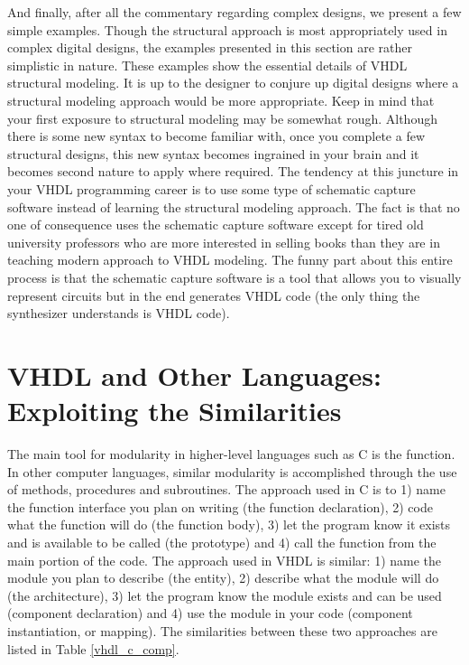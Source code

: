 And finally, after all the commentary regarding complex designs, we present a few simple examples. Though the structural approach is most appropriately used in complex digital designs, the examples presented in this section are rather simplistic in nature. These examples show the essential details of VHDL structural modeling. It is up to the designer to conjure up digital designs where a structural modeling approach would be more appropriate. Keep in mind that your first exposure to structural modeling may be somewhat rough. Although there is some new syntax to become familiar with, once you complete a few structural designs, this new syntax becomes ingrained in your brain and it becomes second nature to apply where required. The tendency at this juncture in your VHDL programming career is to use some type of schematic capture software instead of learning the structural modeling approach. The fact is that no one of consequence uses the schematic capture software except for tired old university professors who are more interested in selling books than they are in teaching modern approach to VHDL modeling. The funny part about this entire process is that the schematic capture software is a tool that allows you to visually represent circuits but in the end generates VHDL code (the only thing the synthesizer understands is VHDL code).

\section{VHDL and Other Languages: Exploiting the Similarities}
The main tool for modularity in higher-level languages such as C is the function. In other computer languages, similar modularity is accomplished through the use of methods, procedures and subroutines. The approach used in C is to 1) name the function interface you plan on writing (the function declaration), 2) code what the function will do (the function body), 3) let the program know it exists and is available to be called (the prototype) and 4) call the function from the main portion of the code. The approach used in VHDL is similar: 1) name the module you plan to describe (the entity), 2) describe what the module will do (the architecture), 3) let the program know the module exists and can be used (component declaration) and 4) use the module in your code (component instantiation, or mapping). The similarities between these two approaches are listed in Table \ref{vhdl_c_comp}.

